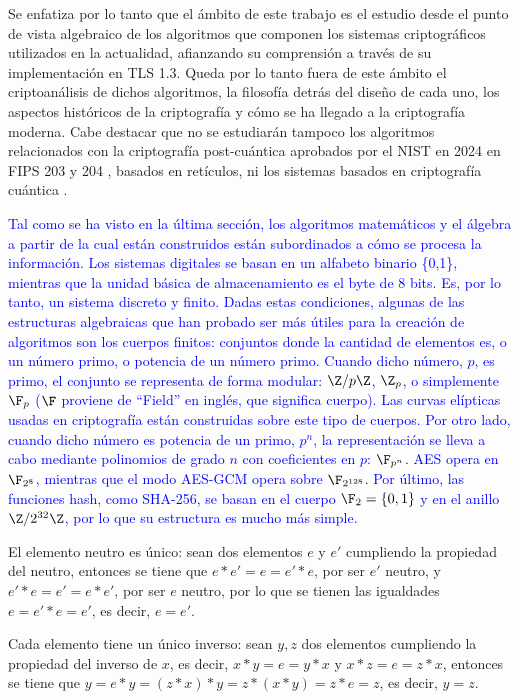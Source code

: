 Se enfatiza por lo tanto que el ámbito de este trabajo es el estudio desde el punto de vista algebraico de los algoritmos que componen los sistemas criptográficos utilizados en la actualidad, afianzando su comprensión a través de su implementación en TLS 1.3. Queda por lo tanto fuera de este ámbito el criptoanálisis de dichos algoritmos, la filosofía detrás del diseño de cada uno, los aspectos históricos de la criptografía y cómo se ha llegado a la criptografía moderna. Cabe destacar que no se estudiarán tampoco los algoritmos relacionados con la criptografía post-cuántica aprobados por el NIST en 2024 en FIPS 203 \cite{fips203} y 204 \cite{fips204}, basados en retículos, ni los sistemas basados en criptografía cuántica \cite{criptocuantica}.


\textcolor{blue}{Tal como se ha visto en la última sección, los algoritmos matemáticos y el álgebra a partir de la cual están construidos están subordinados a cómo se procesa la información. Los sistemas digitales se basan en un alfabeto binario \{0,1\}, mientras que la unidad básica de almacenamiento es el byte de 8 bits. Es, por lo tanto, un sistema discreto y finito. Dadas estas condiciones, algunas de las estructuras algebraicas que han probado ser más útiles para la creación de algoritmos son los cuerpos finitos: conjuntos donde la cantidad de elementos es, o un número primo, o potencia de un número primo. Cuando dicho número, $p$, es primo, el conjunto se representa de forma modular: $\Z/p\Z$, $\Z_p$, o simplemente $\F_p$ ($\F$ proviene de ``Field'' en inglés, que significa cuerpo). Las curvas elípticas usadas en criptografía están construidas sobre este tipo de cuerpos. Por otro lado, cuando dicho número es potencia de un primo, $p^n$, la representación se lleva a cabo mediante polinomios de grado $n$ con coeficientes en $p$: $\F_{p^n}$. AES opera en $\F_{2^8}$, mientras que el modo AES-GCM opera sobre $\F_{2^{128}}$. Por último, las funciones hash, como SHA-256, se basan en el cuerpo $\F_2 = \{0,1\}$ y en el anillo $\Z/2^{32}\Z$, por lo que su estructura es mucho más simple.}

\begin{TFGampliado}
        \item El elemento neutro es único: sean dos elementos $e$ y $e'$ cumpliendo la propiedad del neutro, entonces se tiene que $e \ast e' = e = e' \ast e$, por ser $e'$ neutro, y $e' \ast e = e' = e \ast e'$, por ser $e$ neutro, por lo que se tienen las igualdades $e = e' \ast e = e'$, es decir, $e =  e'$.
        
        \item Cada elemento tiene un único inverso: sean $y,z$ dos elementos cumpliendo la propiedad del inverso de $x$, es decir, $ x \ast y  = e = y \ast x$ y $ x \ast z  = e = z \ast x$, entonces se tiene que $y = e\ast y = (z \ast x) \ast y = z \ast (x \ast y) = z * e = z$, es decir, $y =z$.
\end{TFGampliado}

